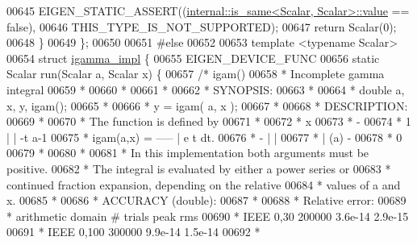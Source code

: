 \begin{DoxyCode}
00645     EIGEN\_STATIC\_ASSERT((\hyperlink{struct_eigen_1_1internal_1_1is__same}{internal::is\_same<Scalar, Scalar>::value} 
      == \textcolor{keyword}{false}),
00646                         THIS\_TYPE\_IS\_NOT\_SUPPORTED);
00647     \textcolor{keywordflow}{return} Scalar(0);
00648   \}
00649 \};
00650 
00651 \textcolor{preprocessor}{#else}
00652 
00653 \textcolor{keyword}{template} <\textcolor{keyword}{typename} Scalar>
00654 \textcolor{keyword}{struct }\hyperlink{struct_eigen_1_1internal_1_1igamma__impl}{igamma\_impl} \{
00655   EIGEN\_DEVICE\_FUNC
00656   \textcolor{keyword}{static} Scalar run(Scalar a, Scalar x) \{
00657     \textcolor{comment}{/*  igam()}
00658 \textcolor{comment}{     *  Incomplete gamma integral}
00659 \textcolor{comment}{     *}
00660 \textcolor{comment}{     *}
00661 \textcolor{comment}{     *}
00662 \textcolor{comment}{     * SYNOPSIS:}
00663 \textcolor{comment}{     *}
00664 \textcolor{comment}{     * double a, x, y, igam();}
00665 \textcolor{comment}{     *}
00666 \textcolor{comment}{     * y = igam( a, x );}
00667 \textcolor{comment}{     *}
00668 \textcolor{comment}{     * DESCRIPTION:}
00669 \textcolor{comment}{     *}
00670 \textcolor{comment}{     * The function is defined by}
00671 \textcolor{comment}{     *}
00672 \textcolor{comment}{     *                           x}
00673 \textcolor{comment}{     *                            -}
00674 \textcolor{comment}{     *                   1       | |  -t  a-1}
00675 \textcolor{comment}{     *  igam(a,x)  =   -----     |   e   t   dt.}
00676 \textcolor{comment}{     *                  -      | |}
00677 \textcolor{comment}{     *                 | (a)    -}
00678 \textcolor{comment}{     *                           0}
00679 \textcolor{comment}{     *}
00680 \textcolor{comment}{     *}
00681 \textcolor{comment}{     * In this implementation both arguments must be positive.}
00682 \textcolor{comment}{     * The integral is evaluated by either a power series or}
00683 \textcolor{comment}{     * continued fraction expansion, depending on the relative}
00684 \textcolor{comment}{     * values of a and x.}
00685 \textcolor{comment}{     *}
00686 \textcolor{comment}{     * ACCURACY (double):}
00687 \textcolor{comment}{     *}
00688 \textcolor{comment}{     *                      Relative error:}
00689 \textcolor{comment}{     * arithmetic   domain     # trials      peak         rms}
00690 \textcolor{comment}{     *    IEEE      0,30       200000       3.6e-14     2.9e-15}
00691 \textcolor{comment}{     *    IEEE      0,100      300000       9.9e-14     1.5e-14}
00692 \textcolor{comment}{     *}

\end{DoxyCode}
